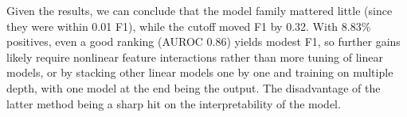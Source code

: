Given the results, we can conclude that the model family mattered little (since they were within 0.01 F1), while the cutoff moved F1 by 0.32. With 8.83\% positives, even a good ranking (AUROC 0.86) yields modest F1, so further gains likely require nonlinear feature interactions rather than more tuning of linear models, or by stacking other linear models one by one and training on multiple depth, with one model at the end being the output. The disadvantage of the latter method being a sharp hit on the interpretability of the model.